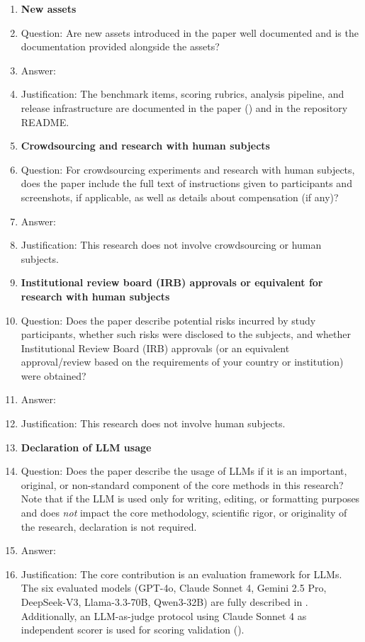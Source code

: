 \begin{enumerate}
\item {\bf New assets}
    \item[] Question: Are new assets introduced in the paper well documented and is the documentation provided alongside the assets?
    \item[] Answer: \answerYes{}
    \item[] Justification: The benchmark items, scoring rubrics, analysis pipeline, and release infrastructure are documented in the paper () and in the repository README.

\item {\bf Crowdsourcing and research with human subjects}
    \item[] Question: For crowdsourcing experiments and research with human subjects, does the paper include the full text of instructions given to participants and screenshots, if applicable, as well as details about compensation (if any)?
    \item[] Answer: \answerNA{}
    \item[] Justification: This research does not involve crowdsourcing or human subjects.

\item {\bf Institutional review board (IRB) approvals or equivalent for research with human subjects}
    \item[] Question: Does the paper describe potential risks incurred by study participants, whether such risks were disclosed to the subjects, and whether Institutional Review Board (IRB) approvals (or an equivalent approval/review based on the requirements of your country or institution) were obtained?
    \item[] Answer: \answerNA{}
    \item[] Justification: This research does not involve human subjects.

\item {\bf Declaration of LLM usage}
    \item[] Question: Does the paper describe the usage of LLMs if it is an important, original, or non-standard component of the core methods in this research? Note that if the LLM is used only for writing, editing, or formatting purposes and does \emph{not} impact the core methodology, scientific rigor, or originality of the research, declaration is not required.
    \item[] Answer: \answerYes{}
    \item[] Justification: The core contribution is an evaluation framework for LLMs. The six evaluated models (GPT-4o, Claude Sonnet 4, Gemini 2.5 Pro, DeepSeek-V3, Llama-3.3-70B, Qwen3-32B) are fully described in . Additionally, an LLM-as-judge protocol using Claude Sonnet 4 as independent scorer is used for scoring validation ().

\end{enumerate}
